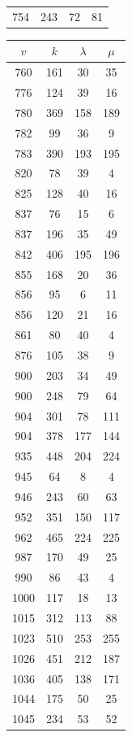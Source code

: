 \documentclass[12pt]{amsproc} %
\theoremstyle{definition}\newtheorem{defn}[thm]{Definition}
\theoremstyle{definition}\newtheorem{rem}[thm]{Remark}
\theoremstyle{definition}\newtheorem{ex}[thm]{Example}
\begin{document}
\begin{table}[ht]
\begin{minipage}{0.25\textwidth}
\begin{tabular}{c|c|c|c}
		754 & 243 & 72 & 81 \\ 
        \end{tabular}
    \end{minipage}
    \hfill
    \begin{minipage}{0.25\textwidth}
        \centering
        \begin{tabular}{c|c|c|c}
            $v$ & $k$ & $\lambda$ & $\mu$ \\ 
            \hline
		760 & 161 & 30 & 35 \\ 
		776 & 124 & 39 & 16 \\ 
		780 & 369 & 158 & 189 \\ 
		782 & 99 & 36 & 9 \\ 
		783 & 390 & 193 & 195 \\ 
		820 & 78 & 39 & 4 \\ 
		825 & 128 & 40 & 16 \\ 
		837 & 76 & 15 & 6 \\ 
		837 & 196 & 35 & 49 \\ 
		842 & 406 & 195 & 196 \\ 
		855 & 168 & 20 & 36 \\ 
		856 & 95 & 6 & 11 \\ 
		856 & 120 & 21 & 16 \\ 
		861 & 80 & 40 & 4 \\ 
		876 & 105 & 38 & 9 \\ 
		900 & 203 & 34 & 49 \\ 
		900 & 248 & 79 & 64 \\ 
		904 & 301 & 78 & 111 \\ 
		904 & 378 & 177 & 144 \\ 
		935 & 448 & 204 & 224 \\ 
		945 & 64 & 8 & 4 \\ 
		946 & 243 & 60 & 63 \\ 
		952 & 351 & 150 & 117 \\ 
		962 & 465 & 224 & 225 \\ 
		987 & 170 & 49 & 25 \\ 
		990 & 86 & 43 & 4 \\ 
		1000 & 117 & 18 & 13 \\ 
		1015 & 312 & 113 & 88 \\ 
		1023 & 510 & 253 & 255 \\ 
		1026 & 451 & 212 & 187 \\ 
		1036 & 405 & 138 & 171 \\ 
		1044 & 175 & 50 & 25 \\ 
		1045 & 234 & 53 & 52 \\ 

\end{tabular}
\end{minipage}
\end{table}
\end{document}
